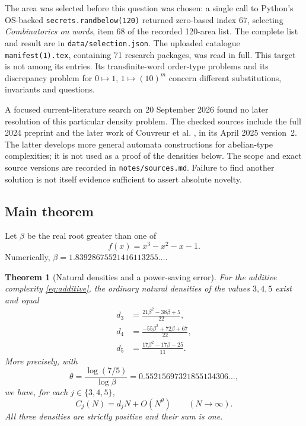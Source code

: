 \documentclass[11pt,a4paper]{article}
\newtheorem{theorem}{Theorem}[section]
\theoremstyle{definition}
\theoremstyle{remark}
\newcommand{\code}[1]{\texttt{#1}}
\begin{document}
The area was selected before this question was chosen: a single call to
Python's OS-backed \code{secrets.randbelow(120)} returned zero-based index
$67$, selecting \emph{Combinatorics on words}, item $68$ of the recorded
120-area list. The complete list and result are in
\code{data/selection.json}. The uploaded catalogue
\code{manifest(1).tex}, containing 71 research packages, was read in full.
This target is not among its entries. Its transfinite-word order-type
problems and its discrepancy problem for $0\mapsto1$, $1\mapsto(10)^m$
concern different substitutions, invariants and questions.

A focused current-literature search on 20 September 2026 found no later
resolution of this particular density problem. The checked sources include
the full 2024 preprint and the later work of Couvreur et al.
\cite{Couvreur}, in its April 2025 version~2. The latter develops more general
automata constructions for abelian-type complexities; it is not used as a
proof of the densities below. The scope and exact source versions are
recorded in \code{notes/sources.md}. Failure to find another solution is not
itself evidence sufficient to assert absolute novelty.

\subsection{Main theorem}
Let $\beta$ be the real root greater than one of
\begin{equation}\label{eq:beta}
 f(x)=x^3-x^2-x-1.
\end{equation}
Numerically, $\beta=1.83928675521416113255\ldots$.

\begin{theorem}[Natural densities and a power-saving error]\label{thm:main}
For the additive complexity \eqref{eq:additive}, the ordinary natural
densities of the values $3,4,5$ exist and equal
\begin{align}
 d_3&=\frac{21\beta^2-38\beta+5}{22},\label{eq:d3}\\
 d_4&=\frac{-55\beta^2+72\beta+67}{22},\label{eq:d4}\\
 d_5&=\frac{17\beta^2-17\beta-25}{11}.\label{eq:d5}
\end{align}
More precisely, with
\begin{equation}\label{eq:theta}
 \theta=\frac{\log(7/5)}{\log\beta}
       =0.55215697321855134306\ldots,
\end{equation}
we have, for each $j\in\{3,4,5\}$,
\begin{equation}\label{eq:mainerror}
 C_j(N)=d_jN+O(N^\theta)\qquad(N\to\infty).
\end{equation}
All three densities are strictly positive and their sum is one.
\end{theorem}
\end{document}
